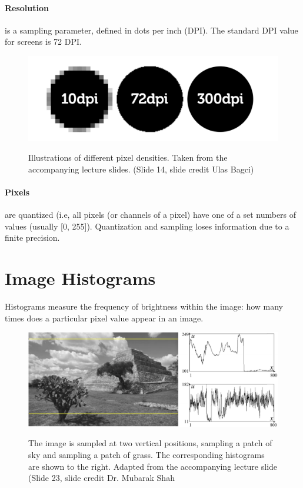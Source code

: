 \documentclass{article}
\begin{document}
\paragraph{Resolution} is a sampling parameter, defined in dots per inch (DPI). The standard DPI value for screens is 72 DPI.
\begin{figure}[h!]
\begin{center}
\includegraphics[scale=0.4]{res.png} \\
\caption{Illustrations of different pixel densities. Taken from the accompanying lecture slides. (Slide 14, slide credit Ulas Bagci)
            }
\end{center}
\end{figure}

				\paragraph{Pixels} are quantized (i.e, all pixels (or channels of a pixel) have one of a set numbers of values (usually [0, 255]). Quantization and sampling loses information due to a finite precision.

\section{Image Histograms}
Histograms measure the frequency of brightness within the image: how many times does a particular pixel value appear in an image. \\

\begin{figure}[h!]
\begin{center}
\includegraphics[scale=0.4]{histogram.png} \\
\caption{The image is sampled at two vertical positions, sampling a patch of sky and sampling a patch of grass. The corresponding histograms are shown to the right. Adapted from the accompanying lecture slide (Slide 23, slide credit Dr. Mubarak Shah}
\end{center}
\end{figure}
\end{document}
